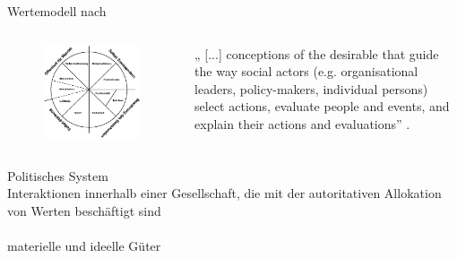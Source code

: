 \documentclass[11pt]{beamer}
\begin{document}
\begin{frame}{Wertemodell nach \cite{Schwartz1992}}
	\begin{columns}
		\begin{column}{0.5\textwidth}
			\begin{figure}[ht]
				\includegraphics[width=\textwidth]{pics/s2-6.png}
			\end{figure}
		\end{column}
		\begin{column}{0.5\textwidth}
			„ [...] conceptions of the desirable that guide the way social actors (e.g. organisational leaders, policy-makers, individual persons) select actions, evaluate people and events, and explain their actions and evaluations” \parencite[24f]{Schwartz1992}.
		\end{column}
	\end{columns}
\end{frame}

\begin{frame}[t]{Politisches System}
 \\ \pause
Interaktionen innerhalb einer Gesellschaft, die mit der autoritativen Allokation von Werten beschäftigt sind \parencite[129ff]{Easton1965}\\  \pause
{} \\ \pause
materielle und ideelle Güter

\end{frame}
\end{document}
